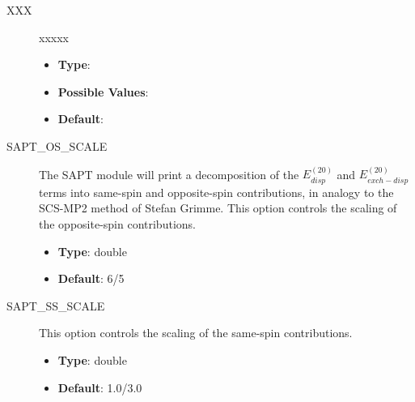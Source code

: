 \documentclass[letterpaper,10pt,english]{sphinxmanual}
\begin{document}
\begin{description}
\item[{XXX}] \leavevmode{}\label{index:term-38}
xxxxx
\begin{itemize}
\item {} 
\textbf{Type}:

\item {} 
\textbf{Possible Values}:

\item {} 
\textbf{Default}:

\end{itemize}

\end{description}
\begin{description}
\item[{SAPT\_OS\_SCALE}] \leavevmode{}\label{index:term-39}
The SAPT module will print a decomposition of the $E_{disp}^{(20)}$
and $E_{exch-disp}^{(20)}$ terms into same-spin and opposite-spin
contributions, in analogy to the SCS-MP2 method of Stefan Grimme. This
option controls the scaling of the opposite-spin contributions.
\begin{itemize}
\item {} 
\textbf{Type}: double

\item {} 
\textbf{Default}: 6/5

\end{itemize}

\end{description}
\begin{description}
\item[{SAPT\_SS\_SCALE}] \leavevmode{}\label{index:term-40}
This option controls the scaling of the same-spin contributions.
\begin{itemize}
\item {} 
\textbf{Type}: double

\item {} 
\textbf{Default}: 1.0/3.0

\end{itemize}

\end{description}
\end{document}
